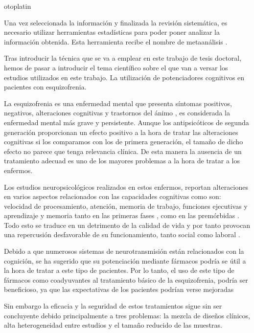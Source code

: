 otoplatin\documentclass[a4paper,openright,12pt]{report}
\begin{document}
Una vez seleccionada la información y finalizada la revisión sistemática, es necesario utilizar herramientas estadísticas para poder poner analizar la información obtenida. Esta herramienta recibe el nombre de metaanálisis \cite{Cochrane_man}.

Tras introducir la técnica que se va a emplear en este trabajo de tesis doctoral, hemos de pasar a introducir el tema científico sobre el que van a versar los estudios utilizados en este trabajo. La utilización de potenciadores cognitivos en pacientes con esquizofrenia.

La esquizofrenia es una enfermedad mental que presenta síntomas positivos, negativos, alteraciones cognitivas y trastornos del ánimo \cite{DSMIV1994}, es considerada la enfermedad mental más grave y persistente. Aunque los antipsicóticos de segunda generación proporcionan un efecto positivo a la hora de tratar las alteraciones cognitivas si los comparamos con los de primera generación, el tamaño de dicho efecto no parece que tenga relevancia clínica. De esta manera la ausencia de un tratamiento adecuad es uno de los mayores problemas a la hora de tratar a los enfermos.

Los estudios neuropsicológicos realizados en estos enfermos, reportan alteraciones en varios aspectos relacionados con las capacidades cognitivas como son: velocidad de procesamiento, atención, memoria de trabajo, funciones ejecutivas y aprendizaje y memoria tanto en las primeras fases \cite{Zabala2009}, como en las premórbidas \cite{Reichenberg2009}. Todo esto se traduce en un detrimento de la calidad de vida y por tanto provocan una repercusión desfavorable de su funcionamiento, tanto social como laboral \cite{Green2006}.

Debido a que numerosos sistemas de neurotransmisión están relacionados con la cognición, se ha sugerido que su potenciación mediante fármacos podría se útil a la hora de tratar a este tipo de pacientes. Por lo tanto, el uso de este tipo de fármacos como coadyuvantes al tratamiento básico de la esquizofrenia, podría ser beneficioso, ya que las expectativas de los pacientes podrían verse mejoradas \cite{Harvey2009}

Sin embargo la eficacia y la seguridad de estos tratamientos sigue sin ser concluyente debido principalmente a tres problemas: la mezcla de diseños clínicos, alta heterogeneidad entre estudios y el tamaño reducido de las muestras. 
\end{document}
